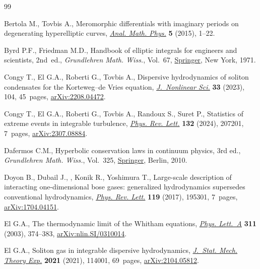 \begin{thebibliography}{99}
\footnotesize\itemsep=0pt

Bertola M., Tovbis A., Meromorphic differentials with imaginary periods on
 degenerating hyperelliptic curves, \href{https://doi.org/10.1007/s13324-014-0088-7}{\textit{Anal. Math. Phys.}} \textbf{5}
 (2015), 1--22.

Byrd P.F., Friedman M.D., Handbook of elliptic integrals for engineers and
 scientists, 2nd~ed., \textit{Grundlehren Math. Wiss.}, Vol.~67, \href{https://doi.org/10.1007/978-3-642-65138-0}{Springer}, New York,
 1971.

Congy T., El G.A., Roberti G., Tovbis A., Dispersive hydrodynamics of soliton
 condensates for the {K}orteweg--de {V}ries equation, \href{https://doi.org/10.1007/s00332-023-09940-y}{\textit{J.~Nonlinear
 Sci.}} \textbf{33} (2023), 104, 45~pages, \href{https://arxiv.org/abs/2208.04472}{arXiv:2208.04472}.

Congy T., El G.A., Roberti G., Tovbis A., Randoux S., Suret P., Statistics of
 extreme events in integrable turbulence, \href{https://doi.org/10.1103/physrevlett.132.207201}{\textit{Phys. Rev. Lett.}}
 \textbf{132} (2024), 207201, 7~pages, \href{https://arxiv.org/abs/2307.08884}{arXiv:2307.08884}.

Dafermos C.M., Hyperbolic conservation laws in continuum physics, 3rd ed.,
 \textit{Grundlehren Math. Wiss.}, Vol.~325, \href{https://doi.org/10.1007/978-3-642-04048-1}{Springer}, Berlin, 2010.

Doyon B., Dubail J., , Konik R., Yoshimura T., Large-scale description of
 interacting one-dimensional bose gases: generalized hydrodynamics supersedes
 conventional hydrodynamics, \href{https://doi.org/10.1103/PhysRevLett.119.195301}{\textit{Phys. Rev. Lett.}} \textbf{119} (2017),
 195301, 7~pages, \href{https://arxiv.org/abs/1704.04151}{arXiv:1704.04151}.

El G.A., The thermodynamic limit of the {W}hitham equations, \href{https://doi.org/10.1016/S0375-9601(03)00515-2}{\textit{Phys.
 Lett.~A}} \textbf{311} (2003), 374--383, \href{https://arxiv.org/abs/nlin.SI/0310014}{arXiv:nlin.SI/0310014}.

El G.A., Soliton gas in integrable dispersive hydrodynamics, \href{https://doi.org/10.1088/1742-5468/ac0f6d}{\textit{J.~Stat.
 Mech. Theory Exp.}} \textbf{2021} (2021), 114001, 69~pages,
 \href{https://arxiv.org/abs/2104.05812}{arXiv:2104.05812}.


\end{thebibliography}
